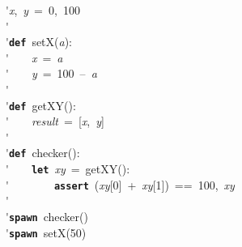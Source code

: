 \'\>\textit{x},~\textit{y}~=~0,~100\\

\'\>\\

\'\>\texttt{\textbf{def}}~setX(\textit{a}):\\

\'\>~~~~\textit{x}~=~\textit{a}\\

\'\>~~~~\textit{y}~=~100~--~\textit{a}\\

\'\>\\

\'\>\texttt{\textbf{def}}~getXY():\\

\'\>~~~~\textit{result}~=~[\textit{x},~\textit{y}]\\

\'\>\\

\'\>\texttt{\textbf{def}}~checker():\\

\'\>~~~~\texttt{\textbf{let}}~\textit{xy}~=~getXY():\\

\'\>~~~~~~~~\texttt{\textbf{assert}}~(\textit{xy}[0]~+~\textit{xy}[1])~==~100,~\textit{xy}\\

\'\>~~~~\\

\'\>\texttt{\textbf{spawn}}~checker()\\

\'\>\texttt{\textbf{spawn}}~setX(50)